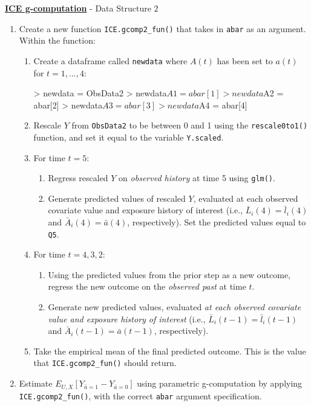 \documentclass[answers]{exam}
\begin{document}
\noindent\textbf{\underline{ICE g-computation}} - Data Structure 2

\begin{enumerate}
\item Create a new function \texttt{ICE.gcomp2\_fun()} that takes in \texttt{abar} as an argument. Within the function:
\begin{enumerate}
\item Create a dataframe called \texttt{newdata} where $A(t)$ has been set to $a(t)$ for $t = 1,...,4$:
\begin{Schunk}
\begin{Sinput}
> newdata = ObsData2
> newdata$A1 = abar[1]
> newdata$A2 = abar[2]
> newdata$A3 = abar[3]
> newdata$A4 = abar[4]
\end{Sinput}
\end{Schunk}
\item Rescale $Y$ from \texttt{ObsData2} to be between 0 and 1 using the \texttt{rescale0to1()} function, and set it equal to the variable \texttt{Y.scaled}.
\item For time $t = 5$:
\begin{enumerate}
\item Regress rescaled $Y$ on \textit{observed history} at time 5 using \texttt{glm()}.
\item Generate predicted values of rescaled $Y$, evaluated at each observed covariate value and exposure history of interest (i.e., $\bar{L}_i(4) = \bar{l}_i(4)$ and $\bar{A}_i(4) = \bar{a}(4)$, respectively). Set the predicted values equal to \texttt{Q5}.
\end{enumerate}
\item For time $t = 4, 3, 2$:
\begin{enumerate}
\item Using the predicted values from the prior step as a new outcome, regress the new outcome on the \textit{observed past} at time $t$.
\item Generate new predicted values, evaluated \textit{at each observed covariate value and exposure history of interest} (i.e., $\bar{L}_i(t-1) = \bar{l}_i(t-1)$ and $\bar{A}_i(t-1) = \bar{a}(t-1)$, respectively).
\end{enumerate}
\item Take the empirical mean of the final predicted outcome. This is the value that \texttt{ICE.gcomp2\_fun()} should return.
\end{enumerate}
\item Estimate $E_{U,X}[Y_{\bar{a} = 1} - Y_{\bar{a} = 0}]$ using parametric g-computation by applying \texttt{ICE.gcomp2\_fun()}, with the correct \texttt{abar} argument specification.
\end{enumerate}
\end{document}
